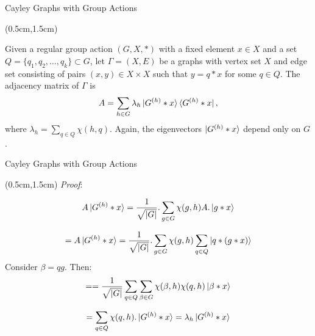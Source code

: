 \documentclass{beamer}
\theoremstyle{definition}
\begin{document}
\begin{frame}{Cayley Graphs with Group Actions}
    \begin{textblock*}{12cm}(0.5cm,1.5cm)

    
    Given a regular group action $(G, X, *)$ with a fixed element $x \in X$ and a set  $Q = \{q_1, q_2, \dots, q_k\} \subset G$, let $\Gamma = (X, E)$ be a graphs with vertex set $X$ and edge set consisting of pairs $(x, y) \in X \times X$ such that $y = q * x$ for some $q \in Q$. The adjacency matrix of $\Gamma$ is
    \[
    A = \sum_{h \in G} \lambda_h \ket{G^{(h)} * x} \bra{G^{(h)} * x}, 
    \]
    where $\lambda_h = \sum_{q \in Q} \chi(h, q)$. Again, the eigenvectors $\ket{G^{(h)} * x}$ depend only on $G$.
        
    \end{textblock*}
\end{frame}






\begin{frame}{Cayley Graphs with Group Actions}
    
    \begin{textblock*}{12cm}(0.5cm,1.5cm)
        \textit{Proof}:

        \[
        A\ket{G^{(h)}*x} = \frac{1}{\sqrt{|G|}}.\sum_{g \in G}\chi(g,h) A.\ket{g*x}
        \]

        \[
        = A\ket{G^{(h)}*x} = \frac{1}{\sqrt{|G|}}.\sum_{g \in G}\chi(g,h)\sum_{q \in Q}\ket{q*(g*x)}
        \]
        Consider $\beta = qg$. Then:
        \[
        = = \frac{1}{\sqrt{|G|}}\sum_{q \in Q}\sum_{\beta \in G}\chi(\beta,h)\chi(q,h)\ket{\beta * x}
        \]

        \[
        = \sum_{q \in Q}\chi(q,h).\ket{G^{(h)}*x} = \lambda_h \ket{G^{(h)}*x}
        \]

    \end{textblock*}

\end{frame}
\end{document}
